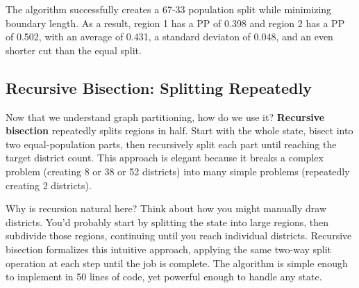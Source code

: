 \documentclass[11pt]{article}
\begin{document}
The algorithm successfully creates a 67-33 population split while minimizing boundary length. As a result, region 1 has a PP of 0.398 and region 2 has a PP of 0.502, with an average of 0.431, a standard deviaton of 0.048, and an even shorter cut than the equal split.

\subsection{Recursive Bisection: Splitting Repeatedly}

Now that we understand graph partitioning, how do we use it? \textbf{Recursive bisection} repeatedly splits regions in half. Start with the whole state, bisect into two equal-population parts, then recursively split each part until reaching the target district count. This approach is elegant because it breaks a complex problem (creating 8 or 38 or 52 districts) into many simple problems (repeatedly creating 2 districts).

Why is recursion natural here? Think about how you might manually draw districts. You'd probably start by splitting the state into large regions, then subdivide those regions, continuing until you reach individual districts. Recursive bisection formalizes this intuitive approach, applying the same two-way split operation at each step until the job is complete. The algorithm is simple enough to implement in 50 lines of code, yet powerful enough to handle any state.
\end{document}
